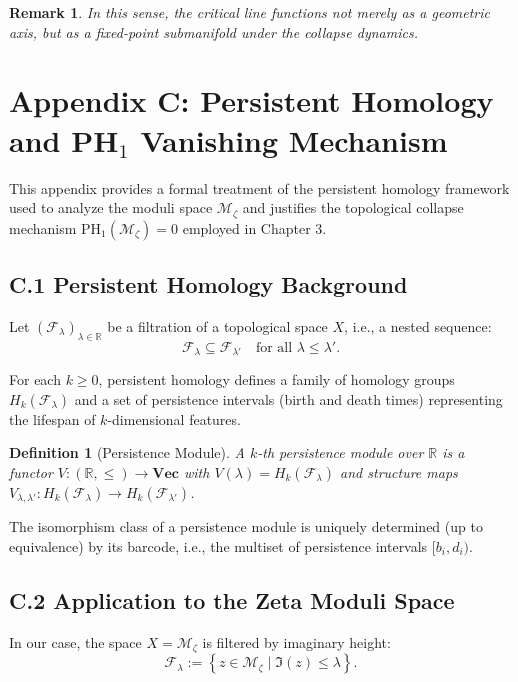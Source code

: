 \documentclass[11pt]{article}
\newtheorem{definition}[theorem]{Definition}
\newtheorem{remark}[theorem]{Remark}
\begin{document}
\begin{remark}
In this sense, the critical line functions not merely as a geometric axis, but as a fixed-point submanifold under the collapse dynamics.
\end{remark}



\section*{Appendix C: Persistent Homology and PH$_1$ Vanishing Mechanism}

This appendix provides a formal treatment of the persistent homology framework used to analyze the moduli space $\mathcal{M}_\zeta$  
and justifies the topological collapse mechanism $\mathrm{PH}_1(\mathcal{M}_\zeta) = 0$ employed in Chapter 3.

\subsection*{C.1 Persistent Homology Background}

Let $(\mathcal{F}_\lambda)_{\lambda \in \mathbb{R}}$ be a filtration of a topological space $X$, i.e., a nested sequence:
\[
\mathcal{F}_\lambda \subseteq \mathcal{F}_{\lambda'} \quad \text{for all } \lambda \leq \lambda'.
\]

For each $k \geq 0$, persistent homology defines a family of homology groups $H_k(\mathcal{F}_\lambda)$  
and a set of persistence intervals (birth and death times) representing the lifespan of $k$-dimensional features.

\begin{definition}[Persistence Module]
A $k$-th persistence module over $\mathbb{R}$ is a functor $V : (\mathbb{R}, \leq) \to \textbf{Vec}$  
with $V(\lambda) = H_k(\mathcal{F}_\lambda)$ and structure maps $V_{\lambda,\lambda'} : H_k(\mathcal{F}_\lambda) \to H_k(\mathcal{F}_{\lambda'})$.
\end{definition}

The isomorphism class of a persistence module is uniquely determined (up to equivalence) by its barcode,  
i.e., the multiset of persistence intervals $[b_i, d_i)$.

\subsection*{C.2 Application to the Zeta Moduli Space}

In our case, the space $X = \mathcal{M}_\zeta$ is filtered by imaginary height:
\[
\mathcal{F}_\lambda := \left\{ z \in \mathcal{M}_\zeta \mid \Im(z) \leq \lambda \right\}.
\]
\end{document}
